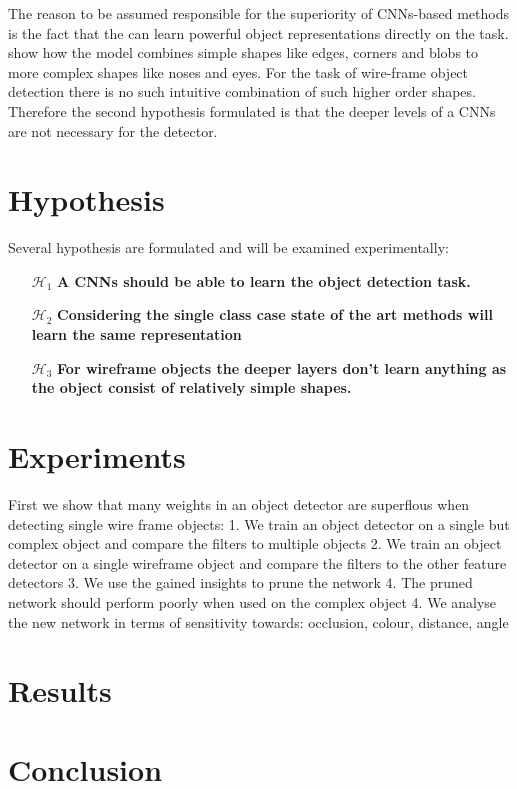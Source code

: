 The reason to be assumed responsible for the superiority of \acp{CNN}-based methods is the fact that the can learn powerful object representations directly on the task.  show how the model combines simple shapes like edges, corners and blobs to more complex shapes like noses and eyes. For the task of wire-frame object detection there is no such intuitive combination of such higher order shapes. Therefore the second hypothesis formulated is that the deeper levels of a \acp{CNN} are not necessary for the detector.

\section{Hypothesis}

\label{sec:object_detection:hypothesis}
Several hypothesis are formulated and will be examined experimentally:
\begin{enumerate}
	\item[$\mathcal{H}_1$] \textbf{A \acp{CNN} should be able to learn the object detection task.}
	\item[$\mathcal{H}_2$] \textbf{Considering the single class case state of the art methods will learn the same representation}
	\item[$\mathcal{H}_3$] \textbf{For wireframe objects the deeper layers don't learn anything as the object consist of relatively simple shapes.}
	
\end{enumerate}
\newpage
\section{Experiments}

First we show that many weights in an object detector are superflous when detecting single wire frame objects:
1. We train an object detector on a single but complex object and compare the filters to multiple objects
2. We train an object detector on a single wireframe object and compare the filters to the other feature detectors
3. We use the gained insights to prune the network 
4. The pruned network should perform poorly when used on the complex object
4. We analyse the new network in terms of sensitivity towards: occlusion, colour, distance, angle

\section{Results}

\section{Conclusion}